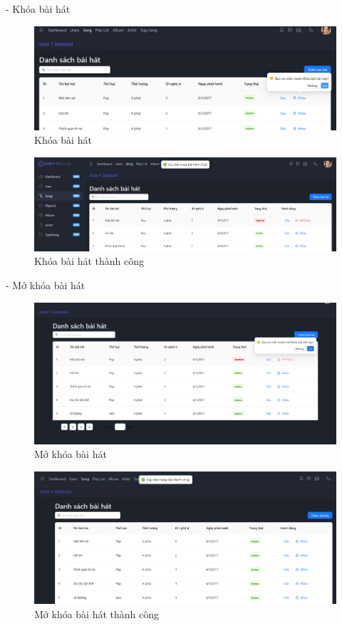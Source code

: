 - Khóa bài hát
\begin{figure}[H]
    \centering
    \includegraphics[width=1\textwidth]{imgs/chap5/ql_bai_hat_6.png}
    \caption{Khóa bài hát}
\end{figure}
\begin{figure}[H]
    \centering
    \includegraphics[width=1\textwidth]{imgs/chap5/ql_bai_hat_7.png}
    \caption{Khóa bài hát thành công}
\end{figure}

- Mở khóa bài hát
\begin{figure}[H]
    \centering
    \includegraphics[width=1\textwidth]{imgs/chap5/ql_bai_hat_9.png}
    \caption{Mở khóa bài hát}
\end{figure}
\begin{figure}[H]
    \centering
    \includegraphics[width=1\textwidth]{imgs/chap5/ql_bai_hat_10.png}
    \caption{Mở khóa bài hát thành công}
\end{figure}


